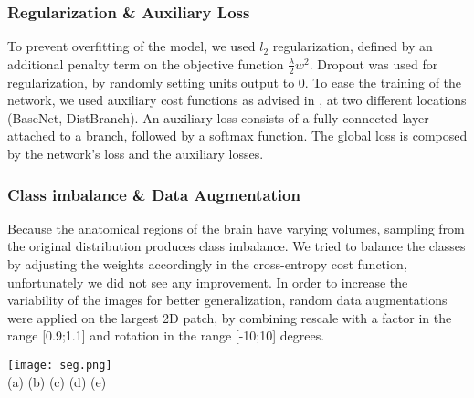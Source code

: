 \documentclass{article}
\begin{document}
\subsubsection{Regularization \& Auxiliary Loss}
To prevent overfitting of the model, we used $l_2$ regularization, defined by an additional penalty term on the objective function $\frac{\lambda}{2} w^2$.
Dropout \cite{srivastava2014dropout} was used for regularization, by randomly setting units output to 0.
To ease the training of the network, we used auxiliary cost functions as advised in \cite{szegedy2017inception}, at two different locations (BaseNet, DistBranch). An auxiliary loss consists of a fully connected layer attached to a branch, followed by a softmax function. The global loss is composed by the network's loss and the auxiliary losses.

\subsubsection{Class imbalance \& Data Augmentation}
Because the anatomical regions of the brain have varying volumes, sampling from the original distribution produces class imbalance. We tried to balance the classes by adjusting the weights accordingly in the cross-entropy cost function, unfortunately we did not see any improvement. \newline
In order to increase the variability of the images for better generalization, random data augmentations were applied on the largest 2D patch, by combining rescale with a factor in the range [0.9;1.1] and rotation in the range [-10;10] degrees.


\begin{figure*}[t!]
    \centering
        \texttt{[image: seg.png]} \\
                (a) \hspace*{30mm} (b) \hspace*{30mm} (c) \hspace*{30mm} (d) \hspace*{30mm} (e)
    \caption{Illustration of the segmentations. Coronal slice (a) and associated segmentation maps : ground truth (b), Full (c), BaseNet+DistBranch (d) and BaseNet (e). The segmentations were obtained on one patient of the test dataset.}
    \label{segmaps}
\end{figure*}
\end{document}
